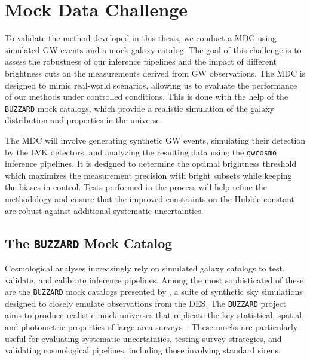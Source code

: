 \chapter{Mock Data Challenge}
\label{chap:MDC}

To validate the method developed in this thesis, we conduct a \acf{MDC} using simulated \ac{GW} events and a mock galaxy catalog. The goal of this challenge is to assess the robustness of our inference pipelines and the impact of different brightness cuts on the measurements derived from \ac{GW} observations. The \ac{MDC} is designed to mimic real-world scenarios, allowing us to evaluate the performance of our methods under controlled conditions. This is done with the help of the \texttt{BUZZARD} mock catalogs, which provide a realistic simulation of the galaxy distribution and properties in the universe. 

The \ac{MDC} will involve generating synthetic \ac{GW} events, simulating their detection by the \acf{LVK} detectors, and analyzing the resulting data using the \texttt{gwcosmo} inference pipelines. It is designed to determine the optimal brightness threshold which maximizes the measurement precision with bright subsets while keeping the biases in control. Tests performed in the process will help refine the methodology and ensure that the improved constraints on the Hubble constant are robust against additional systematic uncertainties.

\section{The \texttt{BUZZARD} Mock Catalog}
Cosmological analyses increasingly rely on simulated galaxy catalogs to test, validate, and calibrate inference pipelines. Among the most sophisticated of these are the \texttt{BUZZARD} mock catalogs presented by \citet{DES:2019jmj}, a suite of synthetic sky simulations designed to closely emulate observations from the \acf{DES}. The \texttt{BUZZARD} project aims to produce realistic mock universes that replicate the key statistical, spatial, and photometric properties of large-area surveys~\citep{DES:2019jmj,DES:2021bwg}. These mocks are particularly useful for evaluating systematic uncertainties, testing survey strategies, and validating cosmological pipelines, including those involving standard sirens.


